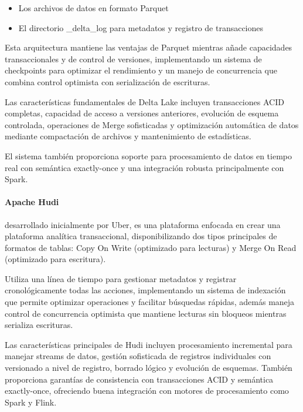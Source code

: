 \begin{itemize}
    \item Los archivos de datos en formato Parquet
    \item El directorio {\_delta\_log} para metadatos y registro de transacciones
\end{itemize}

Esta arquitectura mantiene las ventajas de Parquet mientras añade capacidades transaccionales y de control de versiones, 
implementando un sistema de checkpoints para optimizar el rendimiento y un manejo de concurrencia que combina control optimista 
con serialización de escrituras.\newline

Las características fundamentales de Delta Lake incluyen transacciones ACID completas, 
capacidad de acceso a versiones anteriores, evolución de esquema controlada, 
operaciones de Merge sofisticadas y optimización automática de datos mediante compactación de archivos y mantenimiento de estadísticas. \newline

El sistema también proporciona soporte para procesamiento de datos en tiempo real con semántica exactly-once 
y una integración robusta principalmente con Spark.

\newpage
\paragraph{Apache Hudi}desarrollado inicialmente por Uber, es una plataforma enfocada en crear una plataforma analítica transaccional,
disponibilizando dos tipos principales de formatos de tablas: 
Copy On Write (optimizado para lecturas) y Merge On Read (optimizado para escritura). \newline

Utiliza una línea de tiempo para gestionar metadatos y registrar cronológicamente todas las acciones, 
implementando un sistema de indexación que permite optimizar operaciones y facilitar búsquedas rápidas, 
además maneja control de concurrencia optimista que mantiene lecturas sin bloqueos mientras serializa escrituras.\newline

Las características principales de Hudi incluyen procesamiento incremental para manejar streams de datos, 
gestión sofisticada de registros individuales con versionado a nivel de registro, borrado lógico y evolución de esquemas.
También proporciona garantías de consistencia con transacciones ACID y semántica exactly-once, 
ofreciendo buena integración con motores de procesamiento como Spark y Flink.\newline

